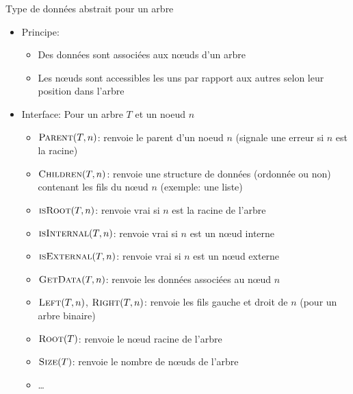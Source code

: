 \begin{frame}{Type de données abstrait pour un arbre}
\begin{itemize}
\item Principe:
\begin{itemize}
\item Des données sont associées aux n\oe uds d'un arbre
\item Les n\oe uds sont accessibles les uns par rapport aux autres selon leur position dans l'arbre
\end{itemize}
\item Interface: Pour un arbre $T$ et un noeud $n$
\begin{itemize}
\item $\textnormal{\scshape Parent}(T,n)$: renvoie le parent d'un noeud $n$ (signale une erreur si $n$ est la racine)
\item $\textnormal{\scshape Children}(T,n)$: renvoie une structure de données (ordonnée
  ou non) contenant les fils du n\oe ud $n$ (exemple: une liste)
\item $\textnormal{\scshape isRoot}(T,n)$: renvoie vrai si $n$ est la racine de l'arbre
\item $\textnormal{\scshape isInternal}(T,n)$: renvoie vrai si $n$ est un n\oe ud interne
\item $\textnormal{\scshape isExternal}(T,n)$: renvoie vrai si $n$ est un n\oe ud externe
\item $\textnormal{\scshape GetData}(T,n)$: renvoie les données associées au n\oe ud $n$
\item $\textnormal{\scshape Left}(T,n)$, $\textnormal{\scshape Right}(T,n)$: renvoie les fils gauche et droit de $n$ (pour un arbre binaire)
\item $\textnormal{\scshape Root}(T)$: renvoie le n\oe ud racine de l'arbre
\item $\textnormal{\scshape Size}(T)$: renvoie le nombre de n\oe uds de l'arbre
\item \ldots
\end{itemize}
\end{itemize}
\end{frame}


